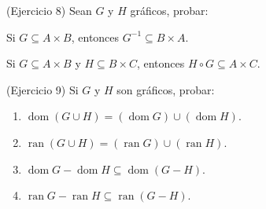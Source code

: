 \begin{problema}(Ejercicio 8)
	Sean $G$ y $H$ gráficos, probar:
	\item  Si $G \subseteq A \times B$, entonces $G^{-1} \subseteq B \times A$.
	\item  Si $G \subseteq A \times B$ y $H \subseteq B \times C$, entonces $H \circ G \subseteq A \times C$.
\end{problema}

\begin{problema}(Ejercicio 9)
	Si $G$ y $H$ son gráficos, probar: 
	\begin{enumerate}
		\item $\operatorname{dom}(G \cup H)=(\operatorname{dom} G) \cup(\operatorname{dom} H)$.
		\item $\operatorname{ran}(G \cup H)=(\operatorname{ran} G) \cup(\operatorname{ran} H)$.
		\item $\operatorname{dom} G-\operatorname{dom} H \subseteq \operatorname{dom}(G-H)$.
		\item $\operatorname{ran} G-\operatorname{ran} H \subseteq \operatorname{ran}(G-H)$.
	\end{enumerate}

\end{problema}




